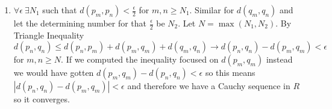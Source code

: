 \documentclass{article}
\begin{document}
\begin{enumerate}
\\
\setcounter{enumi}{22}
\item $\forall \epsilon \ \exists N_1$ such that $d(p_m, p_n)<\frac{\epsilon}{2}$ for $m,n\geq N_1$. Similar for $d(q_m, q_n)$ and let the determining number for that $\frac{\epsilon}{2}$ be $N_2$. Let $N=\max (N_1, N_2)$. By Triangle Inequality $d(p_n, q_n) \le d(p_n, p_m) + d(p_m, q_m) + d(q_m, q_n) \rightarrow d(p_n, q_n) - d(p_m, q_m) < \epsilon$  for $m, n \geq N$. If we computed the inequality focused on $d(p_m, q_m)$ instead we would have gotten $d(p_m, q_m) - d(p_n, q_n) < \epsilon$ so this means $|d(p_n, q_n) - d(p_m, q_m)| < \epsilon$ and therefore we have a Cauchy sequence in $R$ so it converges.
\end{enumerate}
\end{document}
